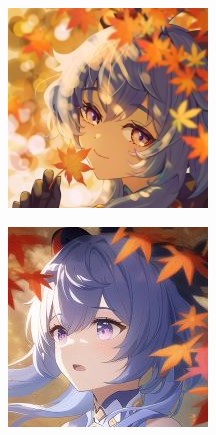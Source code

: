 \documentclass[10pt]{article}
\begin{document}
\begin{center}
  \begin{minipage}{0.3\textwidth}
    \centering
      \begin{minipage}{.5\textwidth}
        \centering
        \includegraphics[width=0.9\linewidth]{ganyu1.jpg}
        \label{fig:test1}
      \end{minipage}%
      \begin{minipage}{.5\textwidth}
        \centering
        \includegraphics[width=0.9\linewidth]{ganyu2.jpg}

\end{minipage}
\end{minipage}
\end{center}
\end{document}
